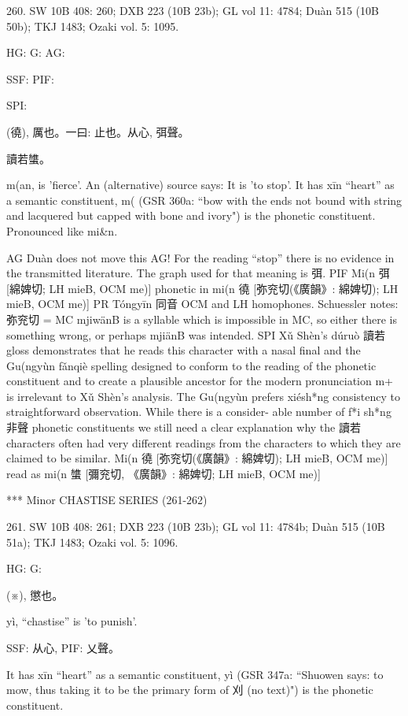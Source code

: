 260. SW 10B 408: 260; DXB 223 (10B 23b); GL vol 11: 4784; Duàn 515 (10B 50b); TKJ 1483; Ozaki vol. 5: 1095.


HG:
G:
AG:

SSF: PIF:


SPI:

(徺),
厲也。一曰: 止也。从心, 弭聲。

讀若䗽。

m(an,
is 'fierce'.
An (alternative) source says:
It is 'to stop'.
It has xīn ``heart'' as a semantic constituent,
m( (GSR 360a: ``bow with the ends not bound with string and lacquered but capped with bone and ivory") is the phonetic constituent.
Pronounced like mi&n.

AG	Duàn does not move this AG!
    For the reading ``stop'' there is no evidence in the transmitted literature. The graph used for that meaning is 弭.
PIF     Mi(n 弭[綿婢切; LH mieB, OCM me)] phonetic in mi(n 徺 [弥兖切(《廣韻》: 綿婢切); LH mieB, OCM me)]
PR Tóngyīn 同音 OCM and LH homophones. Schuessler notes: 弥兖切 = MC mjiwänB is a syllable which is impossible in MC, so either there is something wrong, or perhaps mjiänB was intended.
SPI Xǔ Shèn's dúruò 讀若 gloss demonstrates that he reads this character with a nasal final and the Gu(ngyùn fǎnqiè spelling designed to conform to the reading of the phonetic constituent and to create a plausible ancestor for the modern pronunciation m+ is irrelevant to Xǔ Shèn's analysis. The Gu(ngyùn prefers xiésh*ng consistency to straightforward observation. While there is a consider- able number of f*i sh*ng 非聲 phonetic constituents we still need a clear explanation why the 讀若 characters often had very different readings from the characters to which they are claimed to be similar.
    Mi(n 徺 [弥兖切(《廣韻》: 綿婢切); LH mieB, OCM me)] read as mi(n 䗽 [彌兖切, 《廣韻》: 綿婢切; LH mieB, OCM me)]

***
Minor CHASTISE SERIES (261-262)

261. SW 10B 408: 261; DXB 223 (10B 23b); GL vol 11: 4784b; Duàn 515 (10B 51a); TKJ 1483; Ozaki vol. 5: 1096.


HG:
G:

(※),
懲也。

yì, ``chastise'' is 'to punish'.




SSF: 从心,
PIF: 乂聲。

It has xīn ``heart'' as a semantic constituent,
yì (GSR 347a: ``Shuowen says: to mow, thus taking it to be the primary form of 刈 (no text)") is the phonetic constituent.

